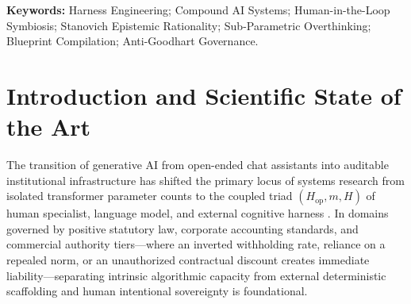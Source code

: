 \documentclass[10pt,twocolumn]{article}
\begin{document}
\begin{abstract}
in-flight revocation checkpoints \texttt{CP-1..3}, ergodic queues ($\varrho_q \le 0.80 < 1$), physical SQL ACLs under a material \texttt{Two-Person Rule}, and DAG-verified Anti-Goodhart feedback (\texttt{M8}), certified across $13$ E2E batteries (\texttt{B1--B13}).
\end{abstract}

\noindent\textbf{Keywords:} Harness Engineering; Compound AI Systems; Human-in-the-Loop Symbiosis; Stanovich Epistemic Rationality; Sub-Parametric Overthinking; Blueprint Compilation; Anti-Goodhart Governance.

\section{Introduction and Scientific State of the Art}

The transition of generative AI from open-ended chat assistants into auditable institutional infrastructure has shifted the primary locus of systems research from isolated transformer parameter counts to the coupled triad $(H_{\mathrm{op}}, m, H)$ of human specialist, language model, and external cognitive harness \cite{zaharia2024shift,khattab2024dspy,bansal2021does}. In domains governed by positive statutory law, corporate accounting standards, and commercial authority tiers---where an inverted withholding rate, reliance on a repealed norm, or an unauthorized contractual discount creates immediate liability---separating intrinsic algorithmic capacity from external deterministic scaffolding and human intentional sovereignty is foundational.
\end{document}
